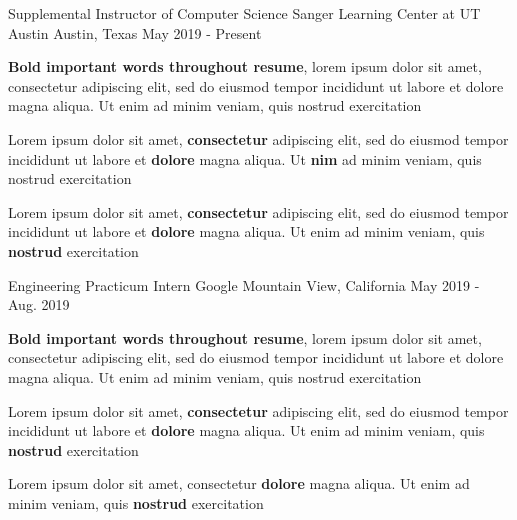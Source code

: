 

\begin{cventries}

\cventry
    {Supplemental Instructor of Computer Science} %
    {Sanger Learning Center at UT Austin} %
    {Austin, Texas} %
    {May 2019 - Present} %
    {
      \begin{cvitems}
      \item {\textbf{Bold important words throughout resume}, lorem ipsum dolor sit amet, consectetur adipiscing elit, sed do eiusmod tempor incididunt ut labore et dolore magna aliqua. Ut enim ad minim veniam, quis nostrud exercitation}
      \item {Lorem ipsum dolor sit amet, \textbf{consectetur} adipiscing elit, sed do eiusmod tempor incididunt ut labore et \textbf{dolore} magna aliqua. Ut \textbf{nim} ad minim veniam, quis nostrud exercitation}
      \item {Lorem ipsum dolor sit amet, \textbf{consectetur} adipiscing elit, sed do eiusmod tempor incididunt ut labore et \textbf{dolore} magna aliqua. Ut enim ad minim veniam, quis \textbf{nostrud} exercitation}
      \end{cvitems}
    }

\cventry
    {Engineering Practicum Intern} %
    {Google} %
    {Mountain View, California} %
    {May 2019 - Aug. 2019} %
    {
      \begin{cvitems}
      \item {\textbf{Bold important words throughout resume}, lorem ipsum dolor sit amet, consectetur adipiscing elit, sed do eiusmod tempor incididunt ut labore et dolore magna aliqua. Ut enim ad minim veniam, quis nostrud exercitation}
      \item {Lorem ipsum dolor sit amet, \textbf{consectetur} adipiscing elit, sed do eiusmod tempor incididunt ut labore et \textbf{dolore} magna aliqua. Ut enim ad minim veniam, quis \textbf{nostrud} exercitation}
      \item {Lorem ipsum dolor sit amet, consectetur \textbf{dolore} magna aliqua. Ut enim ad minim veniam, quis \textbf{nostrud} exercitation}
      \end{cvitems}
    }

\end{cventries}
